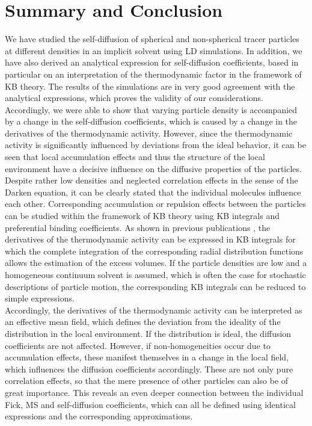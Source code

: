 \documentclass[aip,jcp,reprint]{revtex4-1}
\begin{document}
\section{Summary and Conclusion}
We have studied the self-diffusion of spherical and non-spherical tracer particles at different densities in an implicit solvent using LD simulations. In addition, we have also derived an analytical expression for self-diffusion coefficients, based in particular on an interpretation of the thermodynamic factor in the framework of KB theory. The results of the simulations are in very good agreement with the analytical expressions, which proves the validity of our considerations. Accordingly, we were able to show that varying particle density is accompanied by a change in the self-diffusion coefficients, which is caused by a change in the derivatives of the thermodynamic activity. However, since the thermodynamic activity is significantly influenced by deviations from the ideal behavior, it can be seen that local accumulation effects and thus the structure of the local environment have a decisive influence on the diffusive properties of the particles. \\
Despite rather low densities and neglected correlation effects in the sense of the Darken equation, it can be clearly stated that the individual molecules influence each other.
Corresponding accumulation or repulsion effects between the particles can be studied within the framework of KB theory \cite{kirkwood51} using KB integrals and preferential binding coefficients. As shown in previous publications \cite{ben13a,smith06,smiatek17a}, the derivatives of the thermodynamic activity can be expressed in KB integrals for which the complete integration of the corresponding radial distribution functions allows the estimation of the excess volumes. If the particle densities are low and a homogeneous continuum solvent is assumed, which is often the case for stochastic descriptions of particle motion, the corresponding KB integrals can be reduced to simple expressions. \\
Accordingly, the derivatives of the thermodynamic activity can be interpreted as an effective mean field, which defines the deviation from the ideality of the distribution in the local environment. If the distribution is ideal, the diffusion coefficients are  not affected. However, if non-homogeneities occur due to accumulation effects, these manifest themselves in a change in the local field, which influences the diffusion coefficients accordingly.  These are not only pure correlation effects, so that the mere presence of other particles can also be of great importance. This reveals an even deeper connection between the individual Fick, MS and self-diffusion coefficients, which can all be defined using identical expressions and the corresponding approximations. \\
\end{document}
